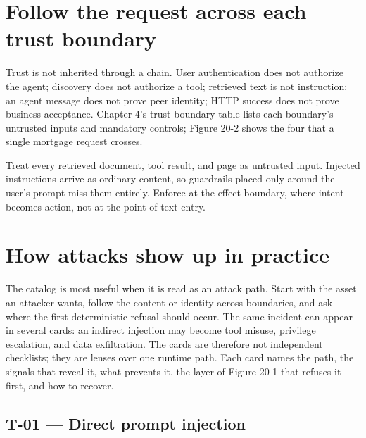 \section{Follow the request across each trust boundary}


Trust is not inherited through a chain. User authentication does not authorize the agent; discovery does not authorize a tool; retrieved text is not instruction; an agent message does not prove peer identity; HTTP success does not prove business acceptance. Chapter 4's trust-boundary table lists each boundary's untrusted inputs and mandatory controls; Figure 20-2 shows the four that a single mortgage request crosses.\par


\begin{booksecurity}
Treat every retrieved document, tool result, and page as untrusted input. Injected instructions arrive as ordinary content, so guardrails placed only around the user's prompt miss them entirely. Enforce at the effect boundary, where intent becomes action, not at the point of text entry.
\end{booksecurity}

\section{How attacks show up in practice}

The catalog is most useful when it is read as an attack path. Start with the asset an attacker wants, follow the content or identity across boundaries, and ask where the first deterministic refusal should occur. The same incident can appear in several cards: an indirect injection may become tool misuse, privilege escalation, and data exfiltration. The cards are therefore not independent checklists; they are lenses over one runtime path. Each card names the path, the signals that reveal it, what prevents it, the layer of Figure 20-1 that refuses it first, and how to recover.\par

\subsection{T-01 — Direct prompt injection}

